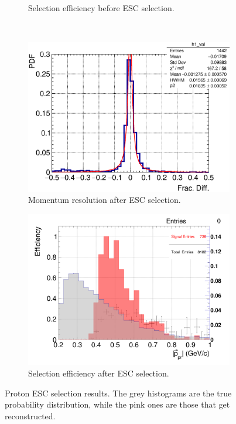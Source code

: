 \begin{figure}[t]
\begin{subfigure}{\dbfigwid\textwidth}
           \caption{Selection efficiency before ESC selection.}
           \label{subfig:ppr-eff-bfESC}
      \end{subfigure}
      \\
      \begin{subfigure}{\dbfigwid\textwidth}
           \includegraphics[width=\textwidth]{figures/sel/p_pr_res_pdf_al14_zoom.eps}
           \caption{Momentum resolution after ESC selection.}
           \label{subfig:ppr-res-afESC}
      \end{subfigure}
      \begin{subfigure}{\dbfigwid\textwidth}
           \includegraphics[width=\textwidth]{figures/sel/p_pr_eff_al14.png}
           \caption{Selection efficiency after ESC selection.}
           \label{subfig:ppr-eff-afESC}
      \end{subfigure}
      \caption{Proton ESC selection results. The grey histograms are the true probability distribution, while the pink ones are those that get reconstructed. }
      \label{fig:esc-ppr-reseff}
   \end{figure}


